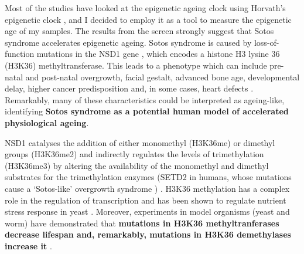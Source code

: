 \bigskip

Most of the studies have looked at the epigenetic ageing clock using Horvath’s epigenetic clock \citep{Horvath2013}, and I decided to employ it as a tool to measure the epigenetic age of my samples. The results from the screen strongly suggest that Sotos syndrome accelerates epigenetic ageing. Sotos syndrome is caused by loss-of-function mutations in the NSD1 gene \citep{Choufani2015,Kurotaki2002}, which encodes a histone H3 lysine 36 (\acrshort{H3K36}) methyltransferase. This leads to a phenotype which can include pre-natal and post-natal overgrowth, facial gestalt, advanced bone age, developmental delay, higher cancer predisposition and, in some cases, heart defects \citep{Leventopoulos2009}. Remarkably, many of these characteristics could be interpreted as ageing-like, identifying \textbf{Sotos syndrome as a potential human model of accelerated physiological ageing}.

\bigskip

NSD1 catalyses the addition of either monomethyl (H3K36me) or dimethyl groups (H3K36me2) and indirectly regulates the levels of trimethylation (\acrshort{H3K36me3}) by altering the availability of the monomethyl and dimethyl substrates for the trimethylation enzymes (SETD2 in humans, whose mutations cause a `Sotos-like' overgrowth syndrome ) \citep{Wagner2012,Luscan2014}. H3K36 methylation has a complex role in the regulation of transcription \citep{Wagner2012} and has been shown to regulate nutrient stress response in yeast \citep{McDaniel2017}. Moreover, experiments in model organisms (yeast and worm) have demonstrated that \textbf{mutations in H3K36 methyltranferases decrease lifespan and, remarkably, mutations in H3K36 demethylases increase it} \citep{Ni2012,Sen2015,Pu2015}.

\bigskip

